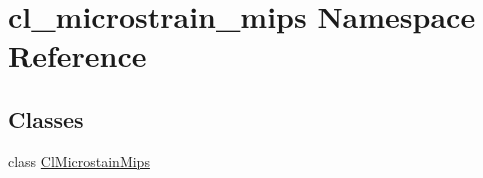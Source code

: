 \hypertarget{namespacecl__microstrain__mips}{}\section{cl\+\_\+microstrain\+\_\+mips Namespace Reference}
\label{namespacecl__microstrain__mips}
\subsection*{Classes}
\begin{DoxyCompactItemize}
\item 
class \hyperlink{classcl__microstrain__mips_1_1ClMicrostainMips}{Cl\+Microstain\+Mips}
\end{DoxyCompactItemize}

